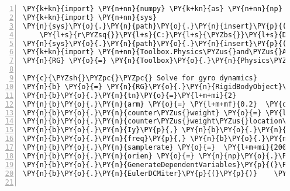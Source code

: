 \begin{Verbatim}[commandchars=\\\{\},fontsize=\small, numbers = left, frame=bottomline]
\PY{k+kn}{import} \PY{n+nn}{numpy} \PY{k+kn}{as} \PY{n+nn}{np}
\PY{k+kn}{import} \PY{n+nn}{sys}
\PY{n}{sys}\PY{o}{.}\PY{n}{path}\PY{o}{.}\PY{n}{insert}\PY{p}{(}\PY{l+m+mi}{0}\PY{p}{,}
    \PY{l+s}{r\PYZsq{}}\PY{l+s}{C:}\PY{l+s}{\PYZbs{}}\PY{l+s}{Documents and Settings}\PY{l+s}{\PYZbs{}}\PY{l+s}{The One}\PY{l+s}{\PYZbs{}}\PY{l+s}{My Documents}\PY{l+s}{\PYZbs{}}\PY{l+s}{tony}\PY{l+s}{\PYZbs{}}\PY{l+s}{Scripts}\PY{l+s}{\PYZbs{}}\PY{l+s}{cordtrans}\PY{l+s}{\PYZsq{}}\PY{p}{)}
\PY{n}{sys}\PY{o}{.}\PY{n}{path}\PY{o}{.}\PY{n}{insert}\PY{p}{(}\PY{l+m+mi}{0}\PY{p}{,} \PY{l+s}{\PYZsq{}}\PY{l+s}{./movie}\PY{l+s}{\PYZsq{}}\PY{p}{)}
\PY{k+kn}{import} \PY{n+nn}{Toolbox.Physics\PYZus{}and\PYZus{}Animation\PYZus{}Modules\PYZus{}Library.RGCordTransV15}
\PY{n}{RG} \PY{o}{=} \PY{n}{Toolbox}\PY{o}{.}\PY{n}{Physics\PYZus{}and\PYZus{}Animation\PYZus{}Modules\PYZus{}Library}\PY{o}{.}\PY{n}{RGCordTransV15}

\PY{c}{\PYZsh{}\PYZpc{}\PYZpc{} Solve for gyro dynamics}
\PY{n}{b} \PY{o}{=} \PY{n}{RG}\PY{o}{.}\PY{n}{RigidBodyObject}\PY{p}{(}\PY{p}{)}
\PY{n}{b}\PY{o}{.}\PY{n}{tn}\PY{o}{=}\PY{l+m+mi}{2}
\PY{n}{b}\PY{o}{.}\PY{n}{arm} \PY{o}{=} \PY{l+m+mf}{0.2}  \PY{c}{\PYZsh{}: location of center of mass of top from origin in meters}
\PY{n}{b}\PY{o}{.}\PY{n}{counter\PYZus{}weight} \PY{o}{=} \PY{l+m+mf}{0.0} \PY{c}{\PYZsh{}: mass doesn\PYZsq{}t spin along symmetry axis}
\PY{n}{b}\PY{o}{.}\PY{n}{counter\PYZus{}weight\PYZus{}location\PYZus{}from\PYZus{}origin} \PY{o}{=} \PY{l+m+mf}{0.0} \PY{c}{\PYZsh{}: location from origin}
\PY{n}{b}\PY{o}{.}\PY{n}{Iy}\PY{p}{,} \PY{n}{b}\PY{o}{.}\PY{n}{Iz}\PY{p}{,} \PY{n}{b}\PY{o}{.}\PY{n}{Ix}\PY{o}{=}\PY{l+m+mf}{0.002}\PY{p}{,} \PY{l+m+mf}{0.0008}\PY{p}{,} \PY{l+m+mf}{0.002}
\PY{n}{b}\PY{o}{.}\PY{n}{freq}\PY{p}{,} \PY{n}{b}\PY{o}{.}\PY{n}{g}\PY{o}{=} \PY{l+m+mi}{12}\PY{p}{,} \PY{l+m+mf}{5.0}
\PY{n}{b}\PY{o}{.}\PY{n}{samplerate} \PY{o}{=}  \PY{l+m+mi}{200}
\PY{n}{b}\PY{o}{.}\PY{n}{orien} \PY{o}{=} \PY{n}{np}\PY{o}{.}\PY{n}{array}\PY{p}{(}\PY{p}{[}\PY{o}{\PYZhy{}}\PY{n}{np}\PY{o}{.}\PY{n}{radians}\PY{p}{(}\PY{l+m+mi}{49}\PY{p}{)}\PY{p}{,}\PY{l+m+mi}{0}\PY{p}{,}\PY{l+m+mi}{0}\PY{p}{]}\PY{p}{)}
\PY{n}{b}\PY{o}{.}\PY{n}{GenerateDependentVariables}\PY{p}{(}\PY{p}{)}  \PY{c}{\PYZsh{}array alocation}
\PY{n}{b}\PY{o}{.}\PY{n}{EulerDCMiter}\PY{p}{(}\PY{p}{)}    \PY{c}{\PYZsh{}solving}


\end{Verbatim}
